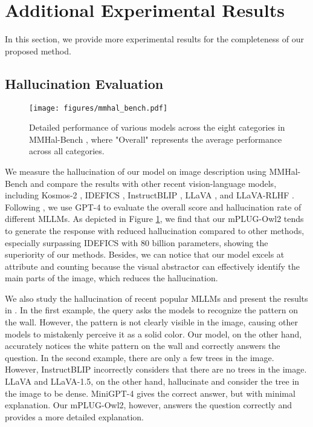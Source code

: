 \documentclass[10pt,twocolumn,letterpaper]{article}
\newcommand{\modelname}{mPLUG-Owl2\xspace}
\begin{document}
{
    \small
    
    
}

\clearpage
\appendix

\section{Additional Experimental Results}
In this section, we provide more experimental results for the completeness of our proposed method.



\subsection{Hallucination Evaluation}
\begin{figure}[h]
    \centering
    \texttt{[image: figures/mmhal\_bench.pdf]}
    \caption{Detailed performance of various models across the eight categories in MMHal-Bench \cite{Sun2023LLavaRlhf}, where "Overall" represents the average performance across all categories.}
    \label{fig:mmhal-bench}
    \vspace{-2ex}
\end{figure}

We measure the hallucination of our model on image description using MMHal-Bench \cite{Sun2023LLavaRlhf} and compare the results with other recent vision-language models, including Kosmos-2 \cite{Peng2023Kosmos2GM}, IDEFICS \cite{laurencon2023idefics}, InstructBLIP \cite{Dai2023InstructBLIP}, LLaVA \cite{Liu2023Llava}, and LLaVA-RLHF \cite{Sun2023LLavaRlhf}. Following \cite{Sun2023LLavaRlhf}, we use GPT-4 to evaluate the overall score and hallucination rate of different MLLMs. As depicted in Figure \ref{fig:mmhal-bench}, we find that our \modelname tends to generate the response with reduced hallucination compared to other methods, especially surpassing IDEFICS \cite{laurencon2023idefics} with 80 billion parameters, showing the superiority of our methods. Besides, we can notice that our model excels at attribute and counting because the visual abstractor can effectively identify the main parts of the image, which reduces the hallucination.

We also study the hallucination of recent popular MLLMs and present the results in . In the first example, the query asks the models to recognize the pattern on the wall. However, the pattern is not clearly visible in the image, causing other models to mistakenly perceive it as a solid color. Our model, on the other hand, accurately notices the white pattern on the wall and correctly answers the question. In the second example, there are only a few trees in the image. However, InstructBLIP incorrectly considers that there are no trees in the image. LLaVA and LLaVA-1.5, on the other hand, hallucinate and consider the tree in the image to be dense. MiniGPT-4 gives the correct answer, but with minimal explanation. Our \modelname, however, answers the question correctly and provides a more detailed explanation.
\end{document}
